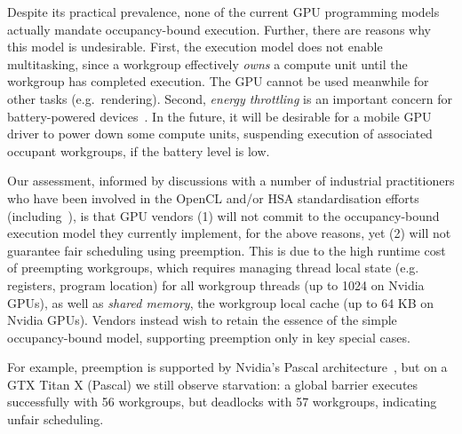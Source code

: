 \documentclass[sigconf]{acmart}
\newcommand{\TSAdded}[1]{#1}
\begin{document}
Despite its practical prevalence, none of the current GPU programming
models actually mandate occupancy-bound execution.  Further, there are
reasons why this model is undesirable.
First, the execution model does not enable
multitasking, since a workgroup effectively \emph{owns} a compute
unit until the workgroup has completed execution.  The GPU cannot be used meanwhile for other
tasks (e.g.\ rendering).
Second, \emph{energy throttling} is an important concern for
battery-powered
devices~\cite{DBLP:journals/comsur/Vallina-RodriguezC13}.  In the
future, it will be desirable for a mobile GPU driver to power down
some compute units, suspending execution of associated occupant
workgroups, if the battery level is low.

Our assessment, informed by discussions with a number of industrial
practitioners who have been involved in the OpenCL and/or HSA
standardisation efforts
(including~\cite{PersonalCommunicationRichards,PersonalCommunicationHowes}),
is that GPU vendors (1) will not commit to the occupancy-bound
execution model they currently implement, for the above reasons, yet
(2) will not guarantee fair scheduling \TSAdded{using preemption. This
  is due to the high runtime cost of preempting workgroups, which
  requires managing thread local state (e.g. registers, program
  location) for all workgroup threads (up to 1024 on Nvidia
  GPUs), as well as \emph{shared memory}, the workgroup local cache
  (up to 64 KB on Nvidia GPUs)}.  Vendors instead wish to retain the
essence of the simple occupancy-bound model, supporting preemption
only in key special cases.

For example, preemption is supported by Nvidia's Pascal architecture~\cite{PascalWhitepaper}, but on a GTX Titan X (Pascal)
we still observe starvation: a global barrier
executes successfully with 56 workgroups, but deadlocks with 57
workgroups, indicating unfair scheduling.
\end{document}
